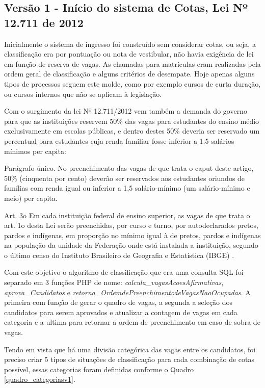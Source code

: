 \subsection{Versão 1 - Início do sistema de Cotas, Lei Nº 12.711 de 2012}
\label{versao1}

Inicialmente o sistema de ingresso foi construído sem considerar cotas, ou seja, a classificação era por pontuação ou nota de vestibular, não havia exigência de lei em função de reserva de vagas. As chamadas para matrículas eram realizadas pela ordem geral de classificação e alguns critérios de desempate. Hoje apenas alguns tipos de processos seguem este molde, como por exemplo cursos de curta duração, ou cursos internos que não se aplicam à legislação.

Com o surgimento da lei Nº 12.711/2012 vem também a demanda do governo para que as instituições reservem 50\% das vagas para estudantes do ensino médio exclusivamente em escolas públicas, e dentro destes 50\% deveria ser reservado um percentual para estudantes cuja renda familiar fosse inferior a 1.5 salários mínimos per capita:

\begin{citacao}
Parágrafo único.  No preenchimento das vagas de que trata o caput deste artigo, 50\% (cinquenta por cento) deverão ser reservados aos estudantes oriundos de famílias com renda igual ou inferior a 1,5 salário-mínimo (um salário-mínimo e meio) per capita.

Art. 3o  Em cada instituição federal de ensino superior, as vagas de que trata o art. 1o desta Lei serão preenchidas, por curso e turno, por autodeclarados pretos, pardos e indígenas, em proporção no mínimo igual à de pretos, pardos e indígenas na população da unidade da Federação onde está instalada a instituição, segundo o último censo do Instituto Brasileiro de Geografia e Estatística (IBGE) \cite{leicotas}.
\end{citacao}

Com este objetivo o algoritmo de classificação que era uma consulta SQL foi separado em 3 funções PHP de nome: \textit{calcula\_vagasAcoesAfirmativas}, \textit{aprova\_Candidatos} e \textit{retorna\_OrdemdePreenchimentodeVagasNaoOcupadas}.  A primeira com função de gerar o quadro de vagas, a segunda a seleção dos candidatos para serem aprovados e atualizar a contagem de vagas em cada categoria e a ultima para retornar a ordem de preenchimento em caso de sobra de vagas.

Tendo em vista que há uma divisão categórica das vagas entre os candidatos, foi preciso criar 5 tipos de situações de classificação para cada combinação de cotas possível, essas categorias foram definidas conforme o Quadro \ref{quadro_categoriasv1}.

